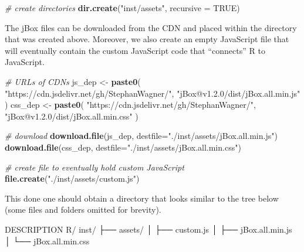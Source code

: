 \documentclass[
]{krantz}
\makeatletter
\newenvironment{Shaded}{\begin{snugshade}}{\end{snugshade}}
\newcommand{\CommentTok}[1]{\textcolor[rgb]{0.37,0.37,0.37}{\textit{#1}}}
\newcommand{\DataTypeTok}[1]{\textcolor[rgb]{0.27,0.27,0.27}{#1}}
\newcommand{\ExtensionTok}[1]{#1}
\newcommand{\KeywordTok}[1]{\textcolor[rgb]{0.27,0.27,0.27}{\textbf{#1}}}
\newcommand{\NormalTok}[1]{#1}
\newcommand{\OtherTok}[1]{\textcolor[rgb]{0.37,0.37,0.37}{#1}}
\newcommand{\StringTok}[1]{\textcolor[rgb]{0.5,0.5,0.5}{#1}}
\newenvironment{kframe}{%
\medskip{}
\setlength{\fboxsep}{.8em}
 \def\at@end@of@kframe{}%
 \ifinner\ifhmode%
  \def\at@end@of@kframe{\end{minipage}}%
  \begin{minipage}{\columnwidth}%
 \fi\fi%
 \def\FrameCommand##1{\hskip\@totalleftmargin \hskip-\fboxsep
 \colorbox{shadecolor}{##1}\hskip-\fboxsep
     \hskip-\linewidth \hskip-\@totalleftmargin \hskip\columnwidth}%
 \MakeFramed {\advance\hsize-\width
   \@totalleftmargin\z@ \linewidth\hsize
   \@setminipage}}%
 {\par\unskip\endMakeFramed%
 \at@end@of@kframe}
\renewenvironment{Shaded}{\begin{kframe}}{\end{kframe}}
\makeatother
\begin{document}
\begin{Shaded}
\begin{Highlighting}[]
\CommentTok{\# create directories}
\KeywordTok{dir.create}\NormalTok{(}\StringTok{"inst/assets"}\NormalTok{, }\DataTypeTok{recursive =} \OtherTok{TRUE}\NormalTok{)}
\end{Highlighting}
\end{Shaded}

The jBox files can be downloaded from the CDN and placed within the directory that was created above. Moreover, we also create an empty JavaScript file that will eventually contain the custom JavaScript code that ``connects'' R to JavaScript.

\begin{Shaded}
\begin{Highlighting}[]
\CommentTok{\# URLs of CDNs}
\NormalTok{js\_dep \textless{}{-}}\StringTok{ }\KeywordTok{paste0}\NormalTok{(}
  \StringTok{"https://cdn.jsdelivr.net/gh/StephanWagner/"}\NormalTok{,}
  \StringTok{"jBox@v1.2.0/dist/jBox.all.min.js"}
\NormalTok{)}
\NormalTok{css\_dep \textless{}{-}}\StringTok{ }\KeywordTok{paste0}\NormalTok{(}
  \StringTok{"https://cdn.jsdelivr.net/gh/StephanWagner/"}\NormalTok{,}
  \StringTok{"jBox@v1.2.0/dist/jBox.all.min.css"}
\NormalTok{)}

\CommentTok{\# download}
\KeywordTok{download.file}\NormalTok{(js\_dep, }\DataTypeTok{destfile=}\StringTok{"./inst/assets/jBox.all.min.js"}\NormalTok{)}
\KeywordTok{download.file}\NormalTok{(css\_dep, }\DataTypeTok{destfile=}\StringTok{"./inst/assets/jBox.all.min.css"}\NormalTok{)}

\CommentTok{\# create file to eventually hold custom JavaScript}
\KeywordTok{file.create}\NormalTok{(}\StringTok{"./inst/assets/custom.js"}\NormalTok{)}
\end{Highlighting}
\end{Shaded}

This done one should obtain a directory that looks similar to the tree below (some files and folders omitted for brevity).

\begin{Shaded}
\begin{Highlighting}[]
\ExtensionTok{DESCRIPTION}
\ExtensionTok{R/}
\ExtensionTok{inst/}
\NormalTok{├── }\ExtensionTok{assets/}
\NormalTok{│    ├── }\ExtensionTok{custom.js}
\NormalTok{│    ├── }\ExtensionTok{jBox.all.min.js}
\NormalTok{│    └── }\ExtensionTok{jBox.all.min.css}
\end{Highlighting}
\end{Shaded}
\end{document}
